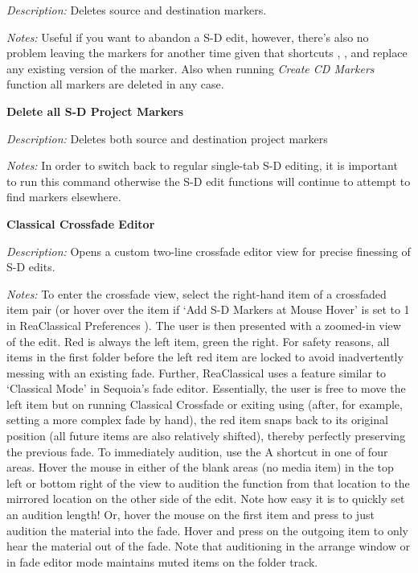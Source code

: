 \documentclass[10pt,american]{article}
\begin{document}
\emph{Description: }Deletes source and destination markers.

\emph{Notes: }Useful if you want to abandon a S-D edit, however, there's also no
problem leaving the markers for another time given that shortcuts 
, , and  replace any existing version of the marker.
Also when running \emph{Create CD Markers} function all markers are deleted in
any case.

\textbf{Delete all S-D Project Markers }\keys{\shift+\del}

\emph{Description:} Deletes both source and destination project markers

\emph{Notes: }In order to switch back to regular single-tab S-D editing, it is
important to run this command otherwise the S-D edit functions will continue to
attempt to find markers elsewhere.

\textbf{Classical Crossfade Editor }

\emph{Description: }Opens a custom two-line crossfade editor view for precise
finessing of S-D edits.

\emph{Notes: }To enter the crossfade view, select the right-hand item of a
crossfaded item pair (or hover over the item if `Add S-D Markers at Mouse Hover'
is set to 1 in ReaClassical Preferences ). The user is then presented
with a zoomed-in view of the edit. Red is always the left item, green the right.
For safety reasons, all items in the first folder before the left red item are
locked to avoid inadvertently messing with an existing fade. Further,
ReaClassical uses a feature similar to `Classical Mode' in Sequoia's fade
editor. Essentially, the user is free to move the left item but on running
Classical Crossfade  or exiting using  (after, for example,
setting a more complex fade by hand), the red item snaps back to its original
position (all future items are also relatively shifted), thereby perfectly
preserving the previous fade. To immediately audition, use the A shortcut in one
of four areas. Hover the mouse in either of the blank areas (no media item) in
the top left or bottom right of the view to audition the function from that
location to the mirrored location on the other side of the edit. Note how easy
it is to quickly set an audition length! Or, hover the mouse on the first item
and press  to just audition the material into the fade. Hover and press
 on the outgoing item to only hear the material out of the fade. Note
that auditioning in the arrange window or in fade editor mode maintains muted
items on the folder track.
\end{document}
